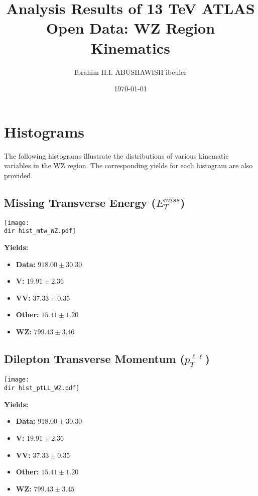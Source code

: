 \documentclass[a4paper,12pt]{article}
\newcommand{\dir}{HZZ-ResultsCL-ibrahim_analysis-03.05.2025_11h/}
\begin{document}
\title{Analysis Results of 13 TeV ATLAS Open Data: WZ Region Kinematics}
\author{Ibrahim H.I. ABUSHAWISH ibeuler}

\date{\today}
\maketitle
\section*{Histograms}
\begin{center}
The following histograms illustrate the distributions of various kinematic variables in the WZ region. The corresponding yields for each histogram are also provided.
\end{center}

\subsection*{Missing Transverse Energy ($E_T^{miss}$)}
\begin{minipage}{0.6\textwidth}
    \centering
    \texttt{[image: \\dir hist\_mtw\_WZ.pdf]}
    \label{fig:mtw}
\end{minipage}%
\begin{minipage}{0.4\textwidth}
    \textbf{Yields:}
    \begin{itemize}
        \item \textbf{Data:} $918.00 \pm 30.30$
        \item \textbf{V:} $19.91 \pm 2.36$
        \item \textbf{VV:} $37.33 \pm 0.35$
        \item \textbf{Other:} $15.41 \pm 1.20$
        \item \textbf{WZ:} $799.43 \pm 3.46$
    \end{itemize}
\end{minipage}

\subsection*{Dilepton Transverse Momentum ($p_T^{\ell\ell}$)}
\begin{minipage}{0.6\textwidth}
    \centering
    \texttt{[image: \\dir hist\_ptLL\_WZ.pdf]}
    \label{fig:ptll}
\end{minipage}%
\begin{minipage}{0.4\textwidth}
    \textbf{Yields:}
    \begin{itemize}
        \item \textbf{Data:} $918.00 \pm 30.30$
        \item \textbf{V:} $19.91 \pm 2.36$
        \item \textbf{VV:} $37.33 \pm 0.35$
        \item \textbf{Other:} $15.41 \pm 1.20$
        \item \textbf{WZ:} $799.43 \pm 3.45$
    \end{itemize}
\end{minipage}
\end{document}
